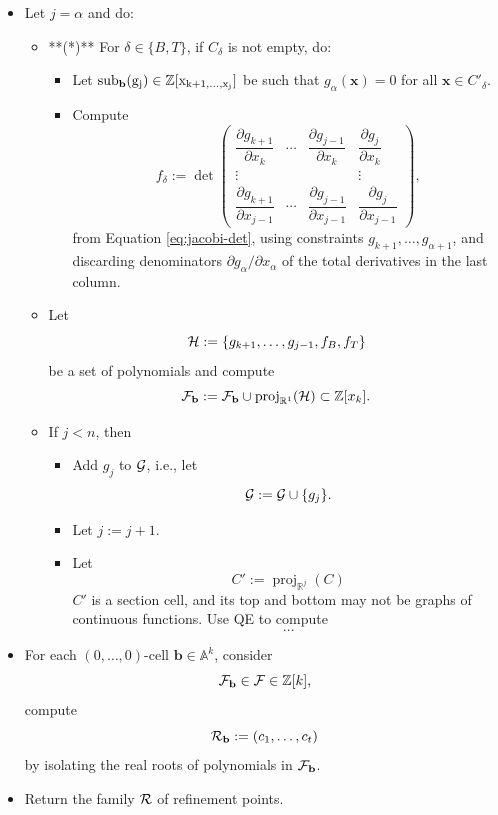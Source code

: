 \documentclass[
]{book}
\theoremstyle{definition}
\theoremstyle{definition}
\theoremstyle{definition}
\theoremstyle{definition}
\theoremstyle{remark}
\begin{document}
\begin{itemize}
\item
  Let \(j = \alpha\) and do:

  \begin{itemize}
  \item
    **(*)** For \(\delta \in \{B, T\}\), if \(C_\delta\) is not empty, do:

    \begin{itemize}
    \item
      Let \(\rm{sub}_{\mathbf{b}} (g_j) \in \mathbb{Z}[x_{k+1,\ldots,x_j}]\) be such that \(g_\alpha(\mathbf{x}) = 0\) for all \(\mathbf{x} \in C'_\delta\).
    \item
      Compute
      \[
      f_\delta := \det\begin{pmatrix}\dfrac{\partial g_{k+1}}{\partial x_{k}} & \cdots & \dfrac{\partial g_{j-1}}{\partial x_{k}} & \dfrac{\partial g_{j}}{\partial x_{k}}\\
      \vdots &  &  & \vdots\\
      \dfrac{\partial g_{k+1}}{\partial x_{j-1}} & \cdots & \dfrac{\partial g_{j-1}}{\partial x_{j-1}} & \dfrac{\partial g_{j}}{\partial x_{j-1}}
      \end{pmatrix},
      \]
      from Equation \eqref{eq:jacobi-det}, using constraints \(g_{k+1},\ldots,g_{\alpha+1}\), and discarding denominators \(\partial g_\alpha / \partial x_\alpha\) of the total derivatives in the last column.
    \end{itemize}
  \item
    Let \[{\cal H} := \{ g_{k+1},\ldots,g_{j-1}, f_B, f_T \}\]
    be a set of polynomials and compute
    \[
    {\cal F}_{\mathbf{b}} := {\cal F}_{\mathbf{b}} \cup {\operatorname{proj}_{\mathbb{R}^{1}}}({\cal H}) \subset \mathbb{Z}[x_k].
    \]
  \item
    If \(j < n\), then

    \begin{itemize}
    \item
      Add \(g_j\) to \(\cal G\), i.e., let
      \[
      {\cal G} := {\cal G} \cup \{ g_j \}.
      \]
    \item
      Let \(j := j+1\).
    \item
      Let
      \[
      C' := {\operatorname{proj}_{\mathbb{R}^{j}}}(C)
      \]
      \(C'\) is a section cell, and its top and bottom may not be graphs of continuous functions. Use QE to compute
      \[
      ...
      \]
    \end{itemize}
  \end{itemize}
\item
  For each \((0,\ldots,0)\)-cell \(\mathbf{b} \in \mathbb{A}^k\), consider
  \[
  {\cal F}_{\mathbf{b}} \in {\cal F} \in \mathbb{Z}[k],
  \]
  compute
  \[
  {\cal R}_{\mathbf{b}} := (c_1,\ldots,c_t)
  \]
  by isolating the real roots of polynomials in \({\cal F}_{\mathbf{b}}\).
\item
  Return the family \({\cal R}\) of refinement points.
\end{itemize}
\end{document}
